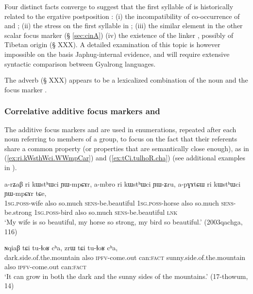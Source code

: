 Four distinct facts converge to suggest that the first syllable of  is historically related to the ergative postposition : (i) the incompatibility of co-occurrence of  and ; (ii) the stress on the first syllable in ; (iii) the similar  element in the other scalar focus marker  (§ \ref{sec:cinA}) (iv) the existence of the linker , possibly of Tibetan origin (§ XXX). A detailed examination of this topic is however impossible on the basis Japhug-internal evidence, and will require extensive syntactic comparison between Gyalrong languages.

The adverb  (§ XXX) appears to be a lexicalized combination of the noun  and the focus marker .

 \subsubsection{Correlative additive focus markers  and } \label{sec:ri.additive} 
 The additive focus markers  and   are used in enumerations, repeated after each noun referring to  members of a group, to focus on the fact that their referents share a common property (or properties that are semantically close enough), as in (\ref{ex:ri.kWsthWci.WWmpCar}) and (\ref{ex:tCi.tulhoR.cha}) (see additional examples in \citealt[313-314]{jacques14linking}).
 
 \begin{exe}
\ex \label{ex:ri.kWsthWci.WWmpCar}
 \gll  a-rʑaβ ri kɯstʰɯci ɲɯ-mpɕɤr, a-mbro ri kɯstʰɯci ɲɯ-ʑru, a-pɣɤtɕɯ ri kɯstʰɯci ɲɯ-mpɕɤr tɕe, \\
 \textsc{1sg}.\textsc{poss}-wife also so.much \textsc{sens}-be.beautiful  \textsc{1sg}.\textsc{poss}-horse also so.much \textsc{sens}-be.strong  \textsc{1sg}.\textsc{poss}-bird also so.much \textsc{sens}-be.beautiful \textsc{lnk} \\
 \glt `My wife is so beautiful, my horse so strong, my bird so beautiful.' (2003qachga, 116)
 \end{exe}
 
  \begin{exe}
\ex \label{ex:tCi.tulhoR.cha}
 \gll  ɴqiaβ tɕi tu-ɬoʁ cʰa, zrɯ tɕi tu-ɬoʁ cʰa, \\
 dark.side.of.the.mountain also \textsc{ipfv}-come.out can:\textsc{fact}   sunny.side.of.the.mountain also \textsc{ipfv}-come.out can:\textsc{fact}  \\
 \glt `It can grow in both the dark and the sunny sides of the mountains.' (17-thowum, 14)
  \end{exe}
  
